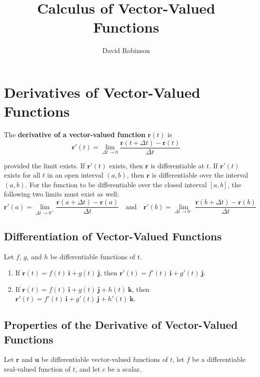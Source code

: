 \documentclass{article}
\title{Calculus of Vector-Valued Functions}
\author{David Robinson}
\date{}
\begin{document}
\maketitle

\section*{Derivatives of Vector-Valued Functions}

The \textbf{derivative of a vector-valued function} $\mathbf{r}(t)$ is
\[\mathbf{r}'(t)=\lim_{\Delta t\rightarrow 0} \frac{\mathbf{r}(t+\Delta t)-\mathbf{r}(t)}{\Delta t}\]

provided the limit exists. If $\mathbf{r}'(t)$ exists, then $\mathbf{r}$ is differentiable at $t$. If $\mathbf{r}'(t)$ exists for all $t$ in an open interval $(a, b)$, then $\mathbf{r}$ is differentiable over the interval $(a, b)$. For the function to be differentiable over the closed interval $[a, b]$, the following two limits must exist as well:
\[\mathbf{r}'(a)=\lim_{\Delta t\rightarrow 0^+}\frac{\mathbf{r}(a+\Delta t)-\mathbf{r}(a)}{\Delta t}\quad\text{and}\quad\mathbf{r}'(b)=\lim_{\Delta t\rightarrow 0^-}\frac{\mathbf{r}(b+\Delta t)-\mathbf{r}(b)}{\Delta t}\]

\subsection*{Differentiation of Vector-Valued Functions}

Let $f$, $g$, and $h$ be differentiable functions of $t$.
\begin{enumerate}
    \item If $\mathbf{r}(t)=f(t)\:\mathbf{i}+g(t)\:\mathbf{j}$, then $\mathbf{r}'(t)=f'(t)\:\mathbf{i}+g'(t)\:\mathbf{j}$.
    \item If $\mathbf{r}(t)=f(t)\:\mathbf{i}+g(t)\:\mathbf{j}+h(t)\:\mathbf{k}$, then $\mathbf{r}'(t)=f'(t)\:\mathbf{i}+g'(t)\:\mathbf{j}+h'(t)\:\mathbf{k}$.
\end{enumerate}

\subsection*{Properties of the Derivative of Vector-Valued Functions}

Let $\mathbf{r}$ and $\mathbf{u}$ be differentiable vector-valued functions of $t$, let $f$ be a differentiable real-valued function of $t$, and let $c$ be a scalar.
\end{document}
